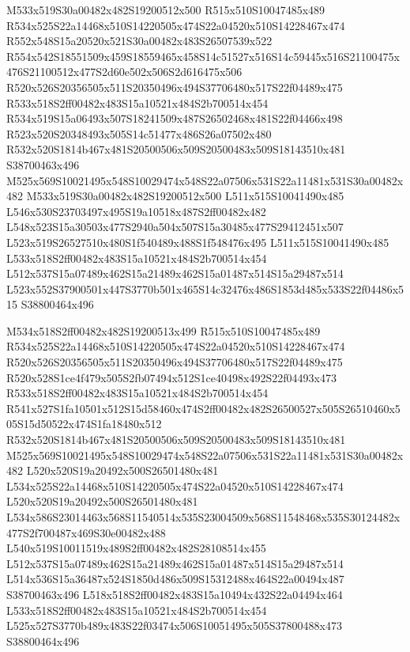 \documentclass{article}
\begin{document}
\begin{multicols}{2}
M533x519S30a00482x482S19200512x500 R515x510S10047485x489 R534x525S22a14468x510S14220505x474S22a04520x510S14228467x474 R552x548S15a20520x521S30a00482x483S26507539x522 R554x542S18551509x459S18559465x458S14c51527x516S14c59445x516S21100475x476S21100512x477S2d60e502x506S2d616475x506 R520x526S20356505x511S20350496x494S37706480x517S22f04489x475 R533x518S2ff00482x483S15a10521x484S2b700514x454 R534x519S15a06493x507S18241509x487S26502468x481S22f04466x498 R523x520S20348493x505S14c51477x486S26a07502x480 R532x520S1814b467x481S20500506x509S20500483x509S18143510x481 S38700463x496 M525x569S10021495x548S10029474x548S22a07506x531S22a11481x531S30a00482x482 M533x519S30a00482x482S19200512x500 L511x515S10041490x485 L546x530S23703497x495S19a10518x487S2ff00482x482 L548x523S15a30503x477S2940a504x507S15a30485x477S29412451x507 L523x519S26527510x480S1f540489x488S1f548476x495 L511x515S10041490x485 L533x518S2ff00482x483S15a10521x484S2b700514x454 L512x537S15a07489x462S15a21489x462S15a01487x514S15a29487x514 L523x552S37900501x447S3770b501x465S14c32476x486S1853d485x533S22f04486x515 S38800464x496

M534x518S2ff00482x482S19200513x499 R515x510S10047485x489 R534x525S22a14468x510S14220505x474S22a04520x510S14228467x474 R520x526S20356505x511S20350496x494S37706480x517S22f04489x475 R520x528S1ce4f479x505S2fb07494x512S1ce40498x492S22f04493x473 R533x518S2ff00482x483S15a10521x484S2b700514x454 R541x527S1fa10501x512S15d58460x474S2ff00482x482S26500527x505S26510460x505S15d50522x474S1fa18480x512 R532x520S1814b467x481S20500506x509S20500483x509S18143510x481 M525x569S10021495x548S10029474x548S22a07506x531S22a11481x531S30a00482x482 L520x520S19a20492x500S26501480x481 L534x525S22a14468x510S14220505x474S22a04520x510S14228467x474 L520x520S19a20492x500S26501480x481 L534x586S23014463x568S11540514x535S23004509x568S11548468x535S30124482x477S2f700487x469S30e00482x488 L540x519S10011519x489S2ff00482x482S28108514x455 L512x537S15a07489x462S15a21489x462S15a01487x514S15a29487x514 L514x536S15a36487x524S1850d486x509S15312488x464S22a00494x487 S38700463x496 L518x518S2ff00482x483S15a10494x432S22a04494x464 L533x518S2ff00482x483S15a10521x484S2b700514x454 L525x527S3770b489x483S22f03474x506S10051495x505S37800488x473 S38800464x496


\end{multicols}
\end{document}
